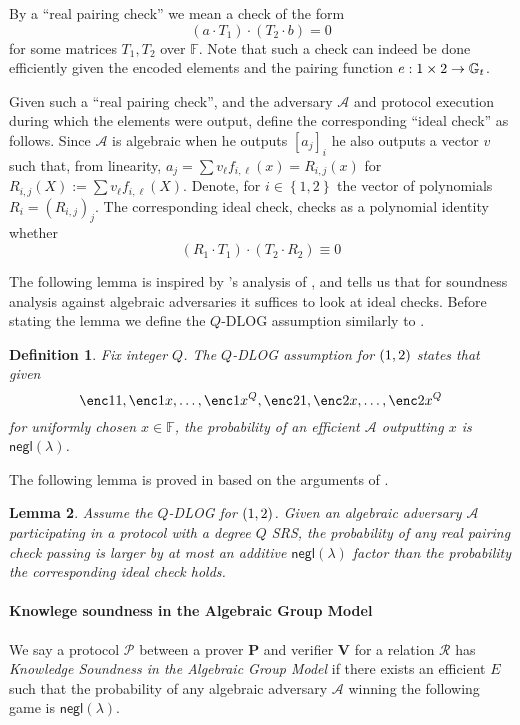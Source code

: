 \documentclass[11pt]{article} %
\newcommand{\Gt}{\ensuremath{{\mathbb G}_t}\xspace}
\newcommand{\F}{\ensuremath{\mathbb F}\xspace}
\newcommand{\adv}{\ensuremath{\mathcal A}\xspace}
\newcommand{\negl}{\ensuremath{\mathsf{negl}(\lambda)}\xspace}
\newcommand{\defeq}{:=}
\newcommand{\enci}[1]{\ensuremath{\left[#1\right]_i}\xspace}
\newcommand{\prv}{\ensuremath{\mathsf{\mathbf{P}}}\xspace}
\newcommand{\ver}{\ensuremath{\mathsf{\mathbf{V}}}\xspace}
\newcommand{\rel}{\ensuremath{\mathcal{R}}\xspace}
\newcommand{\ext}{\ensuremath{E}\xspace}
\newcommand{\set}[1]{\ensuremath{\left\{#1\right\}}\xspace}
\newcommand{\prot}{\ensuremath{\mathscr{P}}\xspace}
\newtheorem{lemma}{Lemma}[section]
\newtheorem{dfn}[lemma]{Definition}
\begin{document}
By a ``real pairing check'' we mean a check of the form
\[(a\cdot T_1) \cdot (T_2\cdot b)=0\]
for some matrices $T_1,T_2$ over $\F$.
Note that such a check can indeed be done efficiently given the encoded elements and the pairing function $e:\G1\times \G2\to \Gt$.



Given such a ``real pairing check'', and the adversary \adv and protocol execution during which the elements were output, define the corresponding ``ideal check'' as follows.
Since \adv is algebraic when he outputs \enci{a_j} he also outputs a vector $v$ such that, from linearity, $a_j = \sum v_\ell f_{i,\ell}(x)=R_{i,j}(x)$ for $R_{i,j}(X) \defeq \sum v_\ell f_{i,\ell}(X)$.
Denote, for $i\in \set{1,2}$ the vector of polynomials $R_i=(R_{i,j})_j$.
The corresponding ideal check, checks as a polynomial identity whether
\[(R_1 \cdot T_1)\cdot (T_2\cdot R_2) \equiv 0\]


The following lemma is inspired by \cite{AGM}'s analysis of \cite{groth16},
and tells us that for soundness analysis against algebraic adversaries it suffices to look at ideal checks.
Before stating the lemma we define the $Q$-DLOG assumption similarly to \cite{AGM}.
\begin{dfn}\label{ref:qdlog}
 Fix integer $Q$. The \emph{$Q$-DLOG assumption for $(\G1,\G2)$} states that given 
 \[\enc1{1},\enc1{x},\ldots,\enc1{x^Q},\enc2{1},\enc2{x},\ldots,\enc2{x^Q}\]
 for uniformly chosen $x\in \F$, the probability of an efficient \adv outputting $x$
 is \negl.
\end{dfn}


The following lemma is proved in \cite{plonk} based on the arguments of \cite{AGM}.
\begin{lemma}\label{lem:AGManalysis}
Assume the $Q$-DLOG for $(\G1,\G2)$.
 Given an algebraic adversary \adv participating in a protocol with a degree $Q$ SRS,
 the probability of any real pairing check passing is larger by at most an additive \negl factor than the probability the corresponding ideal check holds.
\end{lemma}


\paragraph{Knowlege soundness in the Algebraic Group Model}
We say a protocol \prot between a prover \prv and verifier \ver for a relation \rel has \emph{Knowledge Soundness in the Algebraic Group Model} if there exists an efficient \ext such that
the probability of any algebraic adversary \adv winning the following game is \negl.
\end{document}
